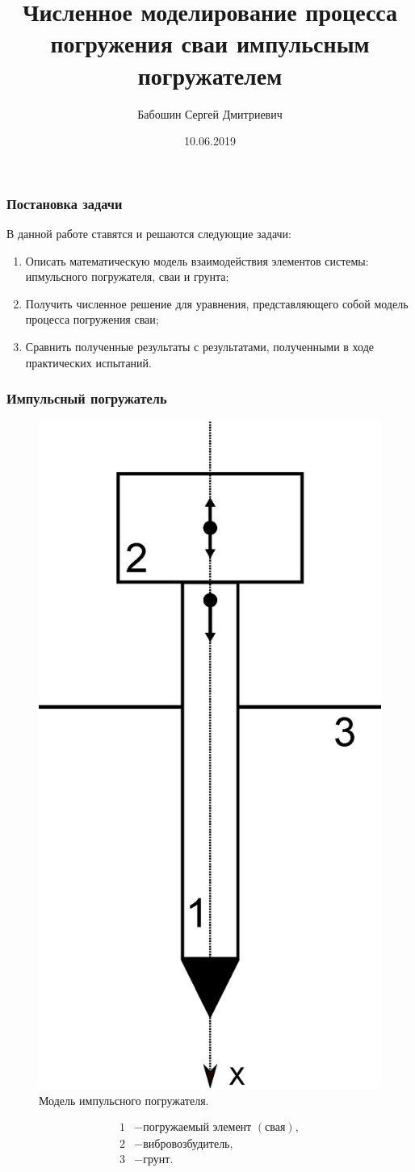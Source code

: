 \documentclass{beamer}
\title{Численное моделирование процесса погружения сваи импульсным погружателем}
\date{10.06.2019}
\author{Бабошин Сергей Дмитриевич}
\begin{document}
    \frame{\titlepage}

    \begin{frame}
        \frametitle{Постановка задачи}
        В данной работе ставятся и решаются следующие задачи:
        \begin{enumerate}
            \item Описать математическую модель взаимодействия элементов системы: ипмульсного погружателя,
            сваи и грунта;
            \item Получить численное решение для уравнения, представляющего собой модель процесса погружения сваи;
            \item Сравнить полученные результаты с результатами, полученными в ходе практических испытаний.
        \end{enumerate}
    \end{frame}

    \begin{frame}
        \frametitle{Импульсный погружатель}
        \begin{figure}
            \includegraphics[width=0.2\linewidth]{pogruzhatel}
            \caption{Модель импульсного погружателя.}
        \end{figure}
        \begin{align*}
            1 &- \text{погружаемый элемент } (\textit{свая}),\\
            2 &- \textit{вибровозбудитель},\\
            3 &- \textit{грунт}.
        \end{align*}
    \end{frame}
\end{document}
